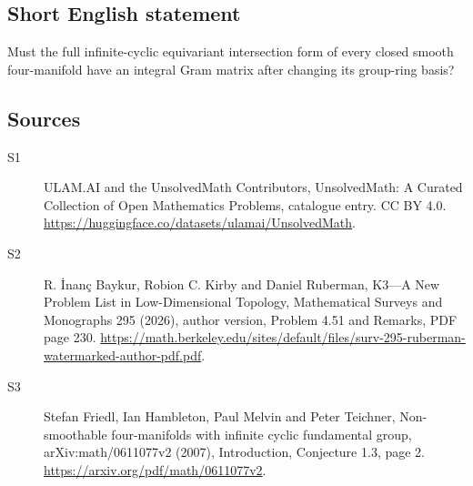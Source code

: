 \documentclass[11pt]{article}
\begin{document}
\subsection{Short English statement}
Must the full infinite-cyclic equivariant intersection form of every closed smooth four-manifold have an integral Gram matrix after changing its group-ring basis?
\subsection{Sources}
\begin{description}
\item[\hypertarget{source:statement:1}{S1}] ULAM.AI and the UnsolvedMath Contributors, UnsolvedMath: A Curated Collection of Open Mathematics Problems, catalogue entry. CC BY 4.0. \url{https://huggingface.co/datasets/ulamai/UnsolvedMath}.
\item[\hypertarget{source:statement:2}{S2}] R. İnanç Baykur, Robion C. Kirby and Daniel Ruberman, K3—A New Problem List in Low-Dimensional Topology, Mathematical Surveys and Monographs 295 (2026), author version, Problem 4.51 and Remarks, PDF page 230. \url{https://math.berkeley.edu/sites/default/files/surv-295-ruberman-watermarked-author-pdf.pdf}.
\item[\hypertarget{source:statement:3}{S3}] Stefan Friedl, Ian Hambleton, Paul Melvin and Peter Teichner, Non-smoothable four-manifolds with infinite cyclic fundamental group, arXiv:math/0611077v2 (2007), Introduction, Conjecture 1.3, page 2. \url{https://arxiv.org/pdf/math/0611077v2}.
\end{description}
\label{end:statement}
\end{document}
